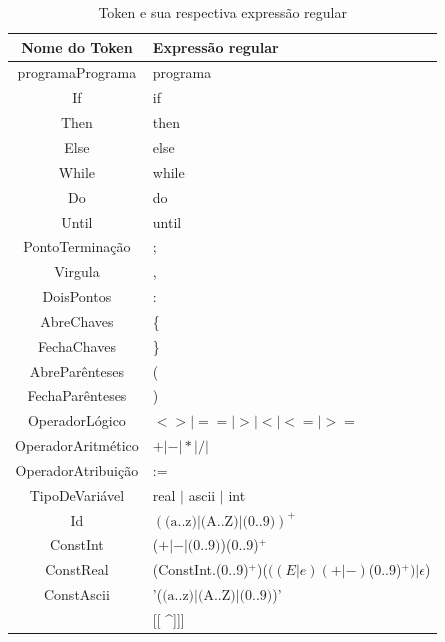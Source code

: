 \documentclass[11pt]{article}
\begin{document}
\begin{table}[H]
    \begin{tabularx}{\textwidth}{c|X}
        \hline
        \textbf{Nome do Token} & \textbf{Expressão regular}   \\ 
        \hline
        programaPrograma & programa  \\  
        \hline
        If  & if \\
        \hline
        Then & then  \\
        \hline
        Else & else \\
        \hline
        While  & while \\
        \hline
        Do & do \\
        \hline
        Until  & until \\
        \hline
        \hline
        PontoTerminação  & ; \\
        \hline
        Virgula  & , \\
        \hline
        DoisPontos  & : \\
        \hline
        AbreChaves  & \{ \\
        \hline
        FechaChaves  & \} \\
        \hline
        AbreParênteses  & ( \\
        \hline
        FechaParênteses  & ) \\
        \hline
        \hline
        OperadorLógico & $<> | == | > | < | <= | >= $   \\
        \hline
        OperadorAritmético & $ + | - | * | / |$   \\
        \hline
        \hline
        OperadorAtribuição & := \\
        \hline
        \hline
        TipoDeVariável & real $|$ ascii $|$ int \\  
        \hline
        \hline
        Id & $(\text{(a..z)}|\text{(A..Z)}|\text{(0..9)})^{+}$ \\
        \hline
        \hline
        ConstInt & ($+ | -| \text{(0..9)}$)(0..9)$^{+}$ \\
        \hline
        ConstReal & (ConstInt.(0..9)$^+$)($((E|e)(+|-)$(0..9)$^+) | \epsilon$)  \\
        \hline
        ConstAscii & '($\text{(a..z)}|\text{(A..Z)}|\text{(0..9)}$)' \\    
        \hline
        [\textit{comentário}] & [[ \^{}]]] \\
        \hline
    \end{tabularx}
    \caption{Token e sua respectiva expressão regular}
\end{table}
\end{document}
